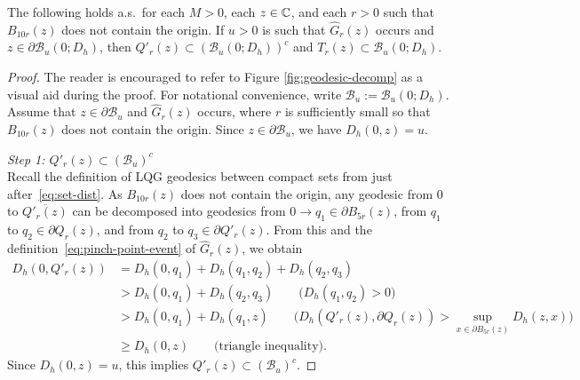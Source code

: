 \documentclass[12pt]{amsart}
\numberwithin{equation}{section}
\begin{document}
	
	\begin{lemma} \label{lemma:geometric-event-consequence}
		The following holds a.s.\ for each $M > 0$, each $z \in \mathbb{C}$, and each $r > 0$ such that $B_{10r}(z)$ does not contain the origin.
		If $u > 0$ is such that $\hat G_r(z)$ occurs and $z \in \partial \mathcal{B}_u(0; D_h)$, then
		$Q'_r(z) \subset (\mathcal{B}_u(0; D_h))^c$ and $T_r(z) \subset \mathcal{B}_u(0; D_h)$. 
	\end{lemma}
	\begin{proof}
		The reader is encouraged to refer to Figure \ref{fig:geodesic-decomp} as a visual aid during the proof. 
		For notational convenience, write $\mathcal{B}_u := \mathcal{B}_u(0; D_h)$.  
		Assume that $z\in \partial \mathcal B_u$ and $\hat G_r(z)$ occurs, where $r$ is sufficiently small so that $B_{10r}(z)$ does not contain the origin.
		Since $z \in \partial \mathcal{B}_u$, we have $D_h(0, z) = u$. 
		
		{\it Step 1: $Q'_r(z) \subset (\mathcal{B}_u)^c$} \\	 
		Recall the definition of LQG geodesics between compact sets from just after~\eqref{eq:set-dist}.
		As $B_{10 r}(z)$ does not contain the origin, any geodesic from $0$ to $\overline{Q'_r(z)}$ can be decomposed into 
		geodesics from $0 \to q_1 \in \partial B_{5 r}(z)$, from $q_1$ to $ q_2 \in \partial Q_r(z)$, and from $q_2$ to $q_3 \in \partial Q'_r(z)$.  
		From this and the definition~\eqref{eq:pinch-point-event} of $\hat G_r(z)$, we obtain
		\begin{align*}
		D_h(0, Q'_r(z))  
		&= D_h(0, q_1) + D_h(q_1, q_2) + D_h(q_2, q_3)  \\
		&> D_h(0, q_1) + D_h(q_2, q_3) \qquad \mbox{($D_h(q_1, q_2) > 0$)} \\
		&> D_h(0, q_1) + D_h(q_1, z) \qquad \mbox{($D_h(Q'_r(z), \partial Q_r(z)) > \sup_{x \in \partial B_{5 r}(z)} D_h(z, x)$)} \\
		& \geq D_h(0, z) \qquad \mbox{(triangle inequality)}.
		\end{align*}
		Since $D_h(0,z) = u$, this implies $Q'_r(z) \subset (\mathcal{B}_u)^c$. 
		

\end{proof}
\end{document}
